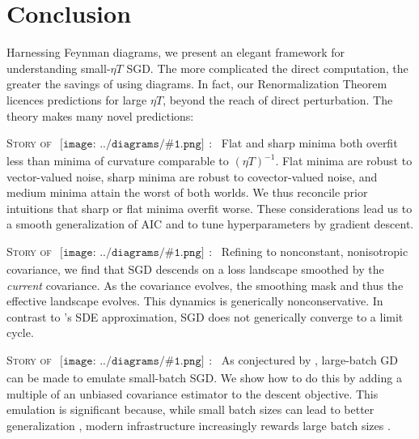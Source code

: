 \documentclass{article}
\newcommand{\sdia}[1]{\begin{gathered}\texttt{[image: ../diagrams/\#1.png]}\end{gathered}}
\begin{document}

\section{Conclusion} \label{sect:concl}


    Harnessing Feynman diagrams, we present an elegant framework for
    understanding small-$\eta T$ SGD.  The more complicated the direct
    computation, the greater the savings of using diagrams.  In fact, our
    Renormalization Theorem licences predictions for large $\eta T$, beyond the
    reach of direct perturbation.  The theory makes many novel predictions:

        \textsc{Story of $\sdia{c(01-2)(02-12)}$:~}
        Flat and sharp minima both overfit less than minima of curvature
        comparable to $(\eta T)^{-1}$.  Flat minima are robust to
        vector-valued noise, sharp minima are robust to
        covector-valued noise, and medium minima attain the worst of both
        worlds.  We thus reconcile prior intuitions that sharp \citep{ ke17,
        wa18} or flat \citep{di17, wu18} minima overfit worse.  These
        considerations lead us to a smooth generalization of AIC and to tune
        hyperparameters by gradient descent.

        \textsc{Story of $\sdia{c(01-2-3)(02-12-23)}$:~}
        Refining \citet{we19b} to nonconstant, nonisotropic covariance, we find
        that SGD descends on a loss landscape smoothed by the \emph{current}
        covariance.  As the covariance evolves, the smoothing mask and thus the
        effective landscape evolves.  This dynamics is generically
        nonconservative.  In contrast to \citet{ch18}'s SDE approximation,
        SGD does not generically converge to a limit cycle. 

        \textsc{Story of $\sdia{c(01-2)(01-12)}$:~}
        As conjectured by \citet{ro18}, large-batch GD can be made to emulate
        small-batch SGD.  We show how to do this by adding a multiple of an
        unbiased covariance estimator to the descent objective.  This emulation
        is significant because, while small batch sizes can lead to better
        generalization \citep{bo91}, modern infrastructure increasingly rewards
        large batch sizes \citep{go18}.  
\end{document}
